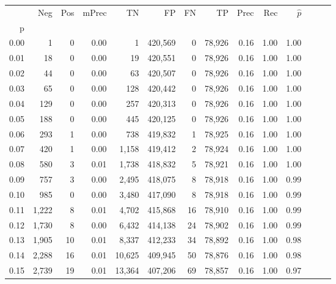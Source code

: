 \begin{tabular}{rrrrrrrrrrrrrr}
\toprule
{} &    Neg &    Pos & mPrec &       TN &       FP &      FN &      TP &  Prec &   Rec & $\hat{p}$ \\
p    &        &        &       &          &          &         &         &       &       &           \\
\midrule
0.00 &      1 &      0 &  0.00 &        1 &  420,569 &       0 &  78,926 &  0.16 &  1.00 &      1.00 \\
0.01 &     18 &      0 &  0.00 &       19 &  420,551 &       0 &  78,926 &  0.16 &  1.00 &      1.00 \\
0.02 &     44 &      0 &  0.00 &       63 &  420,507 &       0 &  78,926 &  0.16 &  1.00 &      1.00 \\
0.03 &     65 &      0 &  0.00 &      128 &  420,442 &       0 &  78,926 &  0.16 &  1.00 &      1.00 \\
0.04 &    129 &      0 &  0.00 &      257 &  420,313 &       0 &  78,926 &  0.16 &  1.00 &      1.00 \\
0.05 &    188 &      0 &  0.00 &      445 &  420,125 &       0 &  78,926 &  0.16 &  1.00 &      1.00 \\
0.06 &    293 &      1 &  0.00 &      738 &  419,832 &       1 &  78,925 &  0.16 &  1.00 &      1.00 \\
0.07 &    420 &      1 &  0.00 &    1,158 &  419,412 &       2 &  78,924 &  0.16 &  1.00 &      1.00 \\
0.08 &    580 &      3 &  0.01 &    1,738 &  418,832 &       5 &  78,921 &  0.16 &  1.00 &      1.00 \\
0.09 &    757 &      3 &  0.00 &    2,495 &  418,075 &       8 &  78,918 &  0.16 &  1.00 &      0.99 \\
0.10 &    985 &      0 &  0.00 &    3,480 &  417,090 &       8 &  78,918 &  0.16 &  1.00 &      0.99 \\
0.11 &  1,222 &      8 &  0.01 &    4,702 &  415,868 &      16 &  78,910 &  0.16 &  1.00 &      0.99 \\
0.12 &  1,730 &      8 &  0.00 &    6,432 &  414,138 &      24 &  78,902 &  0.16 &  1.00 &      0.99 \\
0.13 &  1,905 &     10 &  0.01 &    8,337 &  412,233 &      34 &  78,892 &  0.16 &  1.00 &      0.98 \\
0.14 &  2,288 &     16 &  0.01 &   10,625 &  409,945 &      50 &  78,876 &  0.16 &  1.00 &      0.98 \\
0.15 &  2,739 &     19 &  0.01 &   13,364 &  407,206 &      69 &  78,857 &  0.16 &  1.00 &      0.97 \\

\end{tabular}
